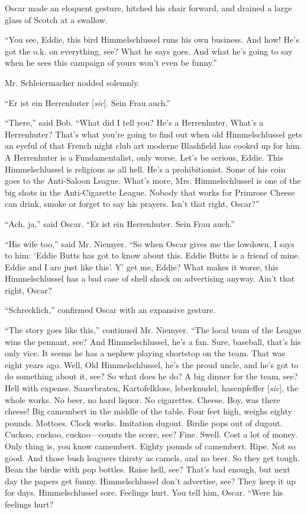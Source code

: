 \documentclass[openany,nobib]{tufte-book}
\begin{document}
Oscar made an eloquent gesture, hitched his chair forward, and drained a
large glass of Scotch at a swallow.

``You see, Eddie, this bird Himmelschlussel runs his own business. And
how! He's got the o.k. on everything, see? What he says goes. And what
he's going to say when he sees this campaign of yours won't even be
funny.''

Mr. Schleiermacher nodded solemnly.

``Er ist ein Herrenhuter [\emph{sic}]. Sein Frau auch.''

``There,'' said Bob. ``What did I tell you? He's a Herrenhuter. What's a
Herrenhuter? That's what you're going to find out when old
Himmelschlussel gets an eyeful of that French night club art moderne
Blashfield has cooked up for him. A Herrenhuter is a Fundamentalist,
only worse. Let's be serious, Eddie. This Himmelschlussel is religious
as all hell. He's a prohibitionist. Some of his coin goes to the
Anti-Saloon League. What's more, Mrs. Himmelschlussel is one of the big
shots in the Anti-Cigarette League. Nobody that works for Primrose
Cheese can drink, smoke or forget to say his prayers. Isn't that right,
Oscar?''

``Ach, ja,'' said Oscar. ``Er ist ein Herrenhuter. Sein Frau auch.''

``His wife too,'' said Mr. Niemyer. ``So when Oscar gives me the
lowdown, I says to him: `Eddie Butts has got to know about this. Eddie
Butts is a friend of mine. Eddie and I are just like this'. Y' get me,
Eddie? What makes it worse, this Himmelschlussel has a bad case of shell
shock on advertising anyway. Ain't that right, Oscar?

``Schrecklich,'' confirmed Oscar with an expansive gesture.

``The story goes like this,'' continued Mr. Niemyer. ``The local team of
the League wins the pennant, see? And Himmelschlussel, he's a fan. Sure,
baseball, that's his only vice. It seems he has a nephew playing
shortstop on the team. That was eight years ago. Well, Old
Himmelschlussel, he's the proud uncle, and he's got to do something
about it, see? So what does he do? A big dinner for the team, see? Hell
with expense. Sauerbraten, Kartofelkloss, leberknudel, hasenpfeffer [\emph{sic}], the
whole works. No beer, no hard liquor. No cigarettes. Cheese. Boy, was
there cheese! Big camembert in the middle of the table. Four feet high,
weighs eighty pounds. Mottoes. Clock works. Imitation dugout. Birdie
pops out of dugout. Cuckoo, cuckoo, cuckoo---counts the score, see?
Fine. Swell. Cost a lot of money. Only thing is, you know camembert.
Eighty pounds of camembert. Ripe. Not so good. And those bush leaguers
thirsty as camels, and no beer. So they get tough. Bean the birdie with
pop bottles. Raise hell, see? That's bad enough, but next day the papers
get funny. Himmelschlussel don't advertise, see? They keep it up for
days. Himmelschlussel sore. Feelings hurt. You tell him, Oscar. ``Were
his feelings hurt?
\end{document}

